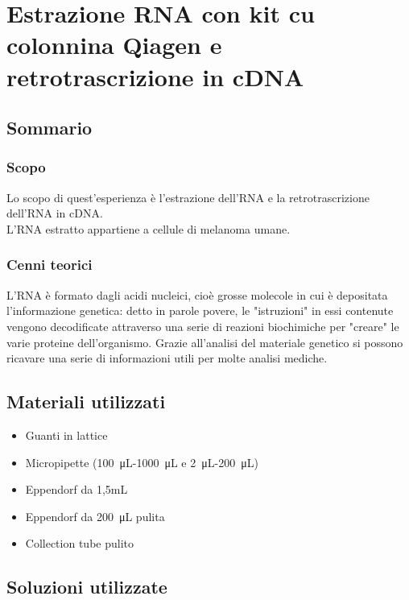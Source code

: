 \section{Estrazione RNA con kit cu colonnina Qiagen e retrotrascrizione in cDNA} %

\subsection{Sommario}

\subsubsection{Scopo}
Lo scopo di quest'esperienza è l'estrazione dell'RNA e la retrotrascrizione dell'RNA in cDNA. \\
L'RNA estratto appartiene a cellule di melanoma umane.

\subsubsection{Cenni teorici}

L'RNA è formato dagli acidi nucleici, cioè grosse molecole in cui è depositata
l'informazione genetica: detto in parole povere, le "istruzioni" in essi contenute
vengono decodificate attraverso una serie di reazioni biochimiche per "creare" le varie proteine dell'organismo.
Grazie all'analisi del materiale genetico si possono ricavare una serie di informazioni utili per molte analisi mediche.

\subsection{Materiali utilizzati}

\begin{itemize}
\item Guanti in lattice
\item Micropipette (\SI{100}{\micro\liter}-\SI{1000}{\micro\liter} e \SI{2}{\micro\liter}-\SI{200}{\micro\liter})
\item Eppendorf da 1,5mL
\item Eppendorf da \SI{200}{\micro\liter} pulita
\item Collection tube pulito
\end{itemize}

\subsection{Soluzioni utilizzate}

